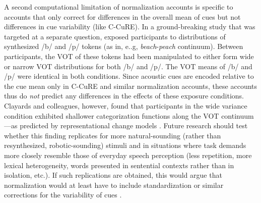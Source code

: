 \documentclass[
  11pt,
  man,floatsintext]{apa6}
\begin{document}
A second computational limitation of normalization accounts is specific to accounts that only correct for differences in the overall mean of cues but not differences in cue variability (like C-CuRE). In a ground-breaking study that was targeted at a separate question, \textcite{clayards2008} exposed participants to distributions of synthesized /b/ and /p/ tokens (as in, e..g, \emph{beach}-\emph{peach} continuum). Between participants, the VOT of these tokens had been manipulated to either form wide or narrow VOT distributions for both /b/ and /p/. The VOT means of /b/ and /p/ were identical in both conditions. Since acoustic cues are encoded relative to the cue mean only in C-CuRE and similar normalization accounts, these accounts thus do \emph{not} predict any differences in the effects of these exposure conditions. Clayards and colleagues, however, found that participants in the wide variance condition exhibited shallower categorization functions along the VOT continuum \autocite[conceptually replicated in][]{nixon2016}---as predicted by representational change models \autocites[see][]{clayards2008,kleinschmidt-jaeger2015,theodore-monto2019}. Future research should test whether this finding replicates for more natural-sounding (rather than resynthesized, robotic-sounding) stimuli and in situations where task demands more closely resemble those of everyday speech perception (less repetition, more lexical heterogeneity, words presented in sentential contexts rather than in isolation, etc.). If such replications are obtained, this would argue that normalization would at least have to include standardization or similar corrections for the variability of cues \autocites[as proposed in][]{johnson2020,lobanov1971,monahan-idsardi2010}.
\end{document}
